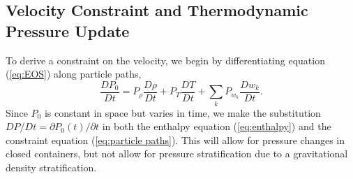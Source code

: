 \documentclass[final]{siamltex}
\begin{document}
\subsection{Velocity Constraint and Thermodynamic Pressure Update}
To derive a constraint on the velocity, we begin by differentiating equation (\ref{eq:EOS})
along particle paths,
\begin{equation}
\frac{DP_0}{Dt} = P_\rho\frac{D\rho}{Dt} + P_T\frac{DT}{Dt} + \sum_kP_{w_k}\frac{Dw_k}{Dt}.\label{eq:particle paths}
\end{equation}
Since $P_0$ is constant in space but varies in time, we make the substitution
$DP/Dt = \partial P_0(t)/\partial t$ in both the enthalpy equation 
(\ref{eq:enthalpy}) and the constraint equation (\ref{eq:particle paths}).
This will allow for pressure changes in closed containers, but not allow for
pressure stratification due to a gravitational density stratification.
\end{document}

